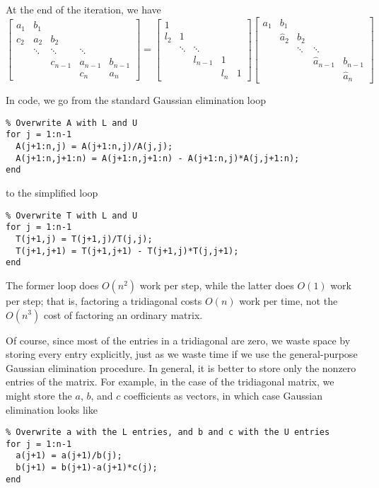 \documentclass[12pt, leqno]{article}
\begin{document}
At the end of the iteration, we have
\[
  \begin{bmatrix}
  a_1 & b_1 \\
  c_2 & a_2 & b_2 \\
      & \ddots & \ddots & \ddots \\
      &        & c_{n-1} & a_{n-1} & b_{n-1} \\
      &        &        & c_n     & a_n
  \end{bmatrix} =
  \begin{bmatrix}
  1 & \\
  l_2 & 1 &  \\
      & \ddots & \ddots & \\
      &        & l_{n-1} & 1 \\
      &        &        & l_n     & 1
  \end{bmatrix}
  \begin{bmatrix}
  a_1 & b_1 \\
      & \hat{a}_2 & b_2 \\
      &      & \ddots & \ddots \\
      &        &      & \hat{a}_{n-1} & b_{n-1} \\
      &        &        &     & \hat{a}_n
  \end{bmatrix}
\]
  
In code, we go from the standard Gaussian elimination loop
\begin{lstlisting}
% Overwrite A with L and U
for j = 1:n-1
  A(j+1:n,j) = A(j+1:n,j)/A(j,j);
  A(j+1:n,j+1:n) = A(j+1:n,j+1:n) - A(j+1:n,j)*A(j,j+1:n);
end
\end{lstlisting}
to the simplified loop
\begin{lstlisting}
% Overwrite T with L and U
for j = 1:n-1
  T(j+1,j) = T(j+1,j)/T(j,j);
  T(j+1,j+1) = T(j+1,j+1) - T(j+1,j)*T(j,j+1);
end
\end{lstlisting}
The former loop does $O(n^2)$ work per step, while the latter does
$O(1)$ work per step; that is, factoring a tridiagonal costs $O(n)$
work per time, not the $O(n^3)$ cost of factoring an ordinary matrix.

Of course, since most of the entries in a tridiagonal are zero,
we waste space by storing every entry explicitly, just as we waste
time if we use the general-purpose Gaussian elimination procedure.
In general, it is better to store only the nonzero entries of the
matrix.  For example, in the case of the tridiagonal matrix,
we might store the $a$, $b$, and $c$ coefficients as vectors,
in which case Gaussian elimination looks like
\begin{lstlisting}
% Overwrite a with the L entries, and b and c with the U entries
for j = 1:n-1
  a(j+1) = a(j+1)/b(j);
  b(j+1) = b(j+1)-a(j+1)*c(j);
end
\end{lstlisting}
\end{document}
